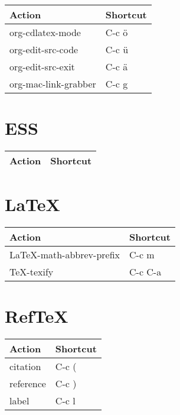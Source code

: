 \documentclass[english]{rcalibritwocolumn}
\begin{document}
\begin{center}
\begin{tabular}{ll}
 \textbf{Action}       &  \textbf{Shortcut}  \\
\hline
 org-cdlatex-mode      &  C-c ö              \\
 org-edit-src-code     &  C-c ü              \\
 org-edit-src-exit     &  C-c ä              \\
 org-mac-link-grabber  &  C-c g              \\
\end{tabular}
\end{center}
\section{ESS}
\label{sec-8}


\begin{center}
\begin{tabular}{ll}
 \textbf{Action}  &  \textbf{Shortcut}  \\
\hline
\end{tabular}
\end{center}
\section{\LaTeX}
\label{sec-9}


\begin{center}
\begin{tabular}{ll}
 \textbf{Action}              &  \textbf{Shortcut}  \\
\hline
 \LaTeX{}-math-abbrev-prefix  &  C-c m              \\
 \TeX{}-texify                &  C-c C-a            \\
\end{tabular}
\end{center}
\section{Ref\TeX}
\label{sec-10}


\begin{center}
\begin{tabular}{ll}
 \textbf{Action}  &  \textbf{Shortcut}  \\
\hline
 citation         &  C-c (              \\
 reference        &  C-c )              \\
 label            &  C-c l              \\
\end{tabular}
\end{center}
\end{document}
